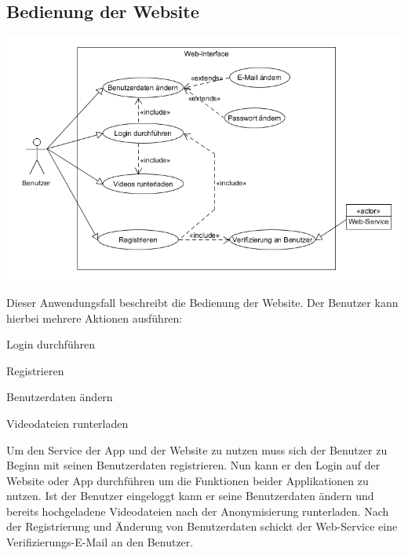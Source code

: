 \subsection{Bedienung der Website}
\begin{center}
\includegraphics[width=1\textwidth]{subtopicsFuncspec/systemModels/WebsiteAWFDiagram.png}
\end{center}
Dieser Anwendungsfall beschreibt die Bedienung der Website.
Der Benutzer kann hierbei mehrere Aktionen ausführen:
\begin{description}
\item Login durchführen
\item Registrieren
\item Benutzerdaten ändern
\item Videodateien runterladen
\end{description}
Um den Service der App und der Website zu nutzen muss sich der Benutzer zu Beginn mit seinen Benutzerdaten registrieren. 
Nun kann er den Login auf der Website oder App durchführen um die Funktionen beider Applikationen zu nutzen. 
Ist der Benutzer eingeloggt kann er seine Benutzerdaten ändern und bereits hochgeladene Videodateien nach der Anonymisierung runterladen.
Nach der Registrierung und Änderung von Benutzerdaten schickt der Web-Service eine Verifizierungs-E-Mail an den Benutzer.